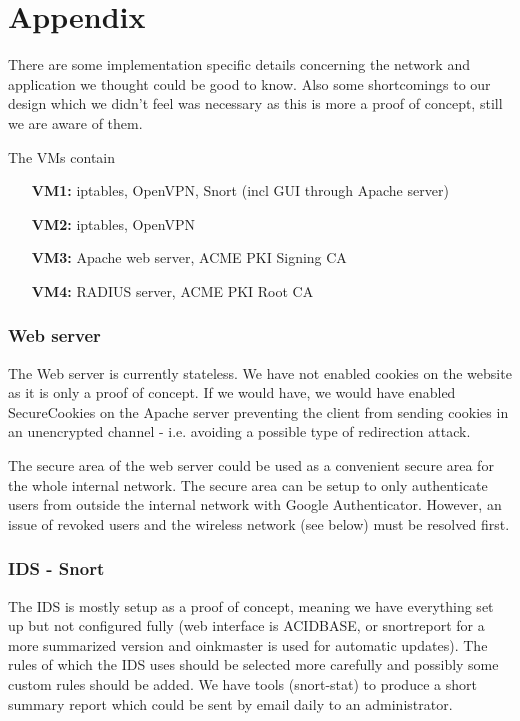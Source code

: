 \section*{Appendix}

There are some implementation specific details concerning the network and application we thought could be good to know. Also some shortcomings to our design which we didn't feel was necessary as this is more a proof of concept, still we are aware of them.

The VMs contain

\begin{itemize}
    \item[\textbf{VM1:}] iptables, OpenVPN, Snort (incl GUI through Apache server)
    \item[\textbf{VM2:}] iptables, OpenVPN
    \item[\textbf{VM3:}] Apache web server, ACME PKI Signing CA
    \item[\textbf{VM4:}] RADIUS server, ACME PKI Root CA
\end{itemize}

\subsubsection*{Web server}

The Web server is currently stateless. We have not enabled cookies on the website as it is only a proof of concept. If we would have, we would have enabled SecureCookies on the Apache server preventing the client from sending cookies in an unencrypted channel - i.e. avoiding a possible type of redirection attack.

The secure area of the web server could be used as a convenient secure area for the whole internal network. The secure area can be setup to only authenticate users from outside the internal network with Google Authenticator. However, an issue of revoked users and the wireless network (see below) must be resolved first.

\subsubsection*{IDS - Snort}

The IDS is mostly setup as a proof of concept, meaning we have  everything set up but not configured fully (web interface is ACIDBASE, or snortreport for a more summarized version and oinkmaster is used for automatic updates). The rules of which the IDS uses should be selected more carefully and possibly some custom rules should be added. We have tools (snort-stat) to produce a short summary report which could be sent by email daily to an administrator.

